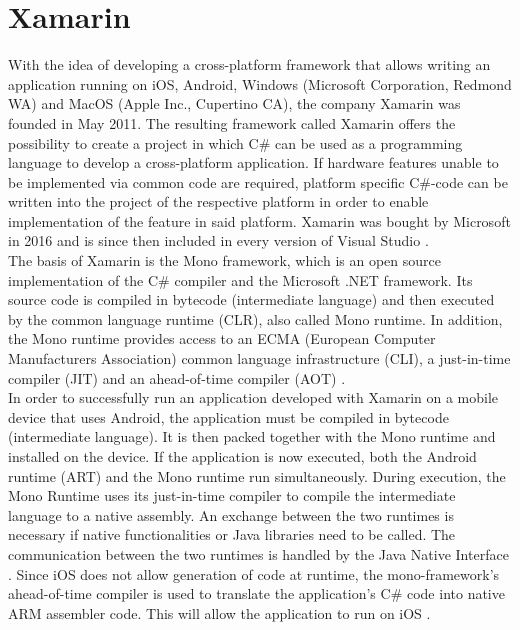 \documentclass[Bachelor,BIF,english]{twbook}
\begin{document}
\section{Xamarin}
With the idea of developing a cross-platform framework that allows writing an application running on iOS, Android, Windows (Microsoft Corporation, Redmond WA) and MacOS (Apple Inc., Cupertino CA), the company Xamarin was founded in May 2011. The resulting framework called Xamarin offers the possibility to create a project in which C\# can be used as a programming language to develop a cross-platform application. If hardware features unable to be implemented via common code are required, platform specific C\#-code can be written into the project of the respective platform in order to enable implementation of the feature in said platform. Xamarin was bought by Microsoft in 2016 and is since then included in every version of Visual Studio \cite[p.~14]{ZubaBernhard2017EdPb} \cite[p.~16]{LinckArne2016}.
\\[\baselineskip]
The basis of Xamarin is the Mono framework, which is an open source implementation of the C\# compiler and the Microsoft .NET framework. Its source code is compiled in bytecode (intermediate language) and then executed by the common language runtime (CLR), also called Mono runtime. In addition, the Mono runtime provides access to an ECMA (European Computer Manufacturers Association) common language infrastructure (CLI), a just-in-time compiler (JIT) and an ahead-of-time compiler (AOT) \cite[p.~14]{ZubaBernhard2017EdPb}.
\\[\baselineskip]
In order to successfully run an application developed with Xamarin on a mobile device that uses Android, the application must be compiled in bytecode (intermediate language). It is then packed together with the Mono runtime and installed on the device. If the application is now executed, both the Android runtime (ART) and the Mono runtime run simultaneously. During execution, the Mono Runtime uses its just-in-time compiler to compile the intermediate language to a native assembly. An exchange between the two runtimes is necessary if native functionalities or Java libraries need to be called. The communication between the two runtimes is handled by the Java Native Interface \cite[p.~14-15]{ZubaBernhard2017EdPb} \cite[p.~456]{WillocxVossaertNaessens2015}. Since iOS does not allow generation of code at runtime, the mono-framework's ahead-of-time compiler is used to translate the application's C\# code into native ARM assembler code. This will allow the application to run on iOS\cite[p.~15]{ZubaBernhard2017EdPb} \cite[p.~456]{WillocxVossaertNaessens2015}.
\end{document}
